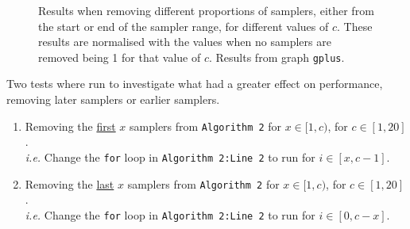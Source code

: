 \documentclass[11pt,twoside,a4paper]{report}
\begin{document}
\begin{figure}[H]
	\label{Figure 5}
	\caption{Results when removing different proportions of samplers, either from the start or end of the sampler range, for different values of $c$. These results are normalised with the values when no samplers are removed being 1 for that value of $c$. Results from graph \texttt{gplus}.}
\end{figure}

\par Two tests where run to investigate what had a greater effect on performance, removing later samplers or earlier samplers.
\begin{enumerate}
	\item Removing the \underline{first} $x$ samplers from \texttt{Algorithm 2} for $x\in[1,c)$, for $c\in[1,20]$.\\
	\textit{i.e.} Change the \texttt{for} loop in \texttt{Algorithm 2:Line 2} to run for $i\in[x,c-1]$.
	\item Removing the \underline{last} $x$ samplers from \texttt{Algorithm 2} for $x\in[1,c)$, for $c\in[1,20]$.\\
	\textit{i.e.} Change the \texttt{for} loop in \texttt{Algorithm 2:Line 2} to run for $i\in[0,c-x]$.
\end{enumerate}
\end{document}
